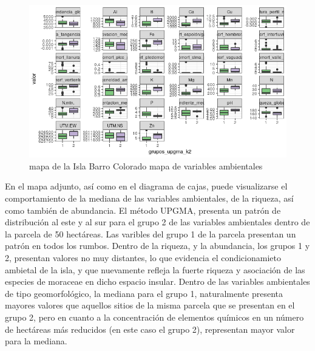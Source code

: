 \documentclass[11pt,]{article}
\begin{document}
\begin{figure}
\centering
\includegraphics[width=1.00000\textwidth]{mapas_variables_ambientales.png}
\caption{mapa de la Isla Barro Colorado mapa de variables ambientales
\label{fig:bci_map}}
\end{figure}

En el mapa adjunto, así como en el diagrama de cajas, puede visualizarse
el comportamiento de la mediana de las variables ambientales, de la
riqueza, así como también de abundancia. El método UPGMA, presenta un
patrón de distribución al este y al sur para el grupo 2 de las variables
ambientales dentro de la parcela de 50 hectáreas. Las varibles del grupo
1 de la parcela presentan un patrón en todos los rumbos. Dentro de la
riqueza, y la abundancia, los grupos 1 y 2, presentan valores no muy
distantes, lo que evidencia el condicionamieto ambietal de la isla, y
que nuevamente refleja la fuerte riqueza y asociación de las especies de
moraceae en dicho espacio insular. Dentro de las variables ambientales
de tipo geomorfológico, la mediana para el grupo 1, naturalmente
presenta mayores valores que aquellos sitios de la misma parcela que se
presentan en el grupo 2, pero en cuanto a la concentración de elementos
químicos en un número de hectáreas más reducidos (en este caso el grupo
2), representan mayor valor para la mediana.
\end{document}
